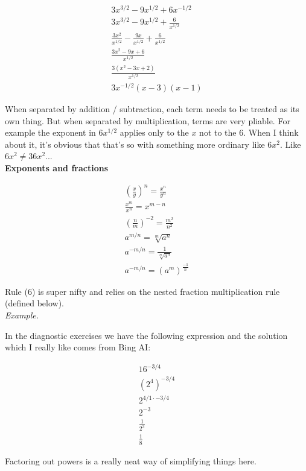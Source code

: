 \documentclass{article}
\begin{document}
\begin{align*}
    3x^{3/2} - 9x^{1/2} + 6x^{-1/2}\\
    3x^{3/2} - 9x^{1/2} + \frac{6}{x^{1/2}}\\
    \frac{3x^2}{x^{1/2}} - \frac{9x}{x^{1/2}} + \frac{6}{x^{1/2}}\\
    \frac{3x^2 - 9x + 6}{x^{1/2}}\\
    \frac{3(x^2 - 3x + 2)}{x^{1/2}}\\
    3x^{-1/2}(x-3)(x-1)
\end{align*}

When separated by addition / subtraction, each term needs to be treated as its own thing.
But when separated by multiplication, terms are very pliable. For example the exponent in
$6x^{1/2}$ applies only to the $x$ not to the $6$. When I think about it, it's obvious
that that's so with something more ordinary like $6x^2$. Like $6x^2 \neq 36x^2$... \\

\textbf{Exponents and fractions}

\begin{align}
    \left( \frac{x}{y}\right) ^n = \frac{x^n}{y^n}\\
    \frac{x^m}{x^n} = x^{m-n}\\
    \left( \frac{n}{m}\right) ^{-2} = \frac{m^2}{n^2}\\
    a^{m/n} = \sqrt[m]{a^n}\\
    a^{-m/n} = \frac{1}{\sqrt[m]{a^n}}\\
    a^{-m/n} = (a^m)^{\frac{-1}{n}}
\end{align}

Rule (6) is super nifty and relies on the nested fraction multiplication rule (defined
below).\\

\emph{Example.}

In the diagnostic exercises we have the following expression and the solution which I
really like comes from Bing AI:

\begin{align*}
    16^{-3/4}\\
    (2^4)^{-3/4}\\
    2^{4/1 \cdot -3/4}\\
    2^{-3}\\
    \frac{1}{2^3}\\
    \frac{1}{8}
\end{align*}

Factoring out powers is a really neat way of simplifying things here.\\
\end{document}

